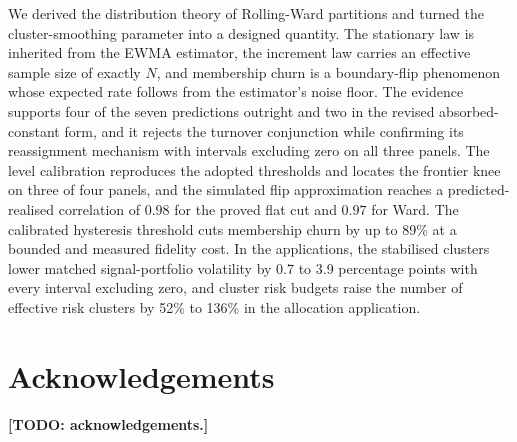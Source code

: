 \documentclass{rQUF2e}
\theoremstyle{plain}
\theoremstyle{remark}
\newcommand{\TODO}[1]{\textbf{[TODO: #1]}}
\begin{document}
We derived the distribution theory of Rolling-Ward partitions and turned the
cluster-smoothing parameter into a designed quantity. The stationary law is
inherited from the EWMA estimator, the increment law carries an effective
sample size of exactly $N$, and membership churn is a boundary-flip
phenomenon whose expected rate follows from the estimator's noise floor.
The evidence supports four of the seven predictions outright and two in the
revised absorbed-constant form, and it rejects the turnover conjunction while
confirming its reassignment mechanism with intervals excluding zero on all
three panels. The level calibration reproduces the adopted thresholds and
locates the frontier knee on three of four panels, and the simulated flip
approximation reaches a predicted-realised correlation of $0.98$ for the
proved flat cut and $0.97$ for Ward. The calibrated hysteresis threshold cuts
membership churn by up to 89\% at a bounded and measured fidelity cost. In
the applications, the stabilised clusters lower matched signal-portfolio
volatility by 0.7 to 3.9 percentage points with every interval excluding
zero, and cluster risk budgets raise the number of effective risk clusters by
52\% to 136\% in the allocation application.



\section*{Acknowledgements}
\TODO{acknowledgements.}
\end{document}
